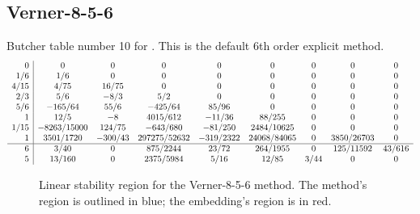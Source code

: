 \documentclass[letterpaper,10pt,english]{sphinxmanual}
\begin{document}
\subsection{Verner-8-5-6}
\label{Butcher:butcher-verner-6-5}\label{Butcher:verner-8-5-6}
Butcher table number 10
for {\hyperref[c_interface/User_callable:ARKodeSetERKTableNum]{}}.  This is
the default 6th order explicit method.
\begin{gather}
\begin{split}\begin{array}{r|cccccccc}
  0 & 0 & 0 & 0 & 0 & 0 & 0 & 0 & 0 \\
  1/6 & 1/6 & 0 & 0 & 0 & 0 & 0 & 0 & 0 \\
  4/15 & 4/75 & 16/75 & 0 & 0 & 0 & 0 & 0 & 0 \\
  2/3 & 5/6 & -8/3 & 5/2 & 0 & 0 & 0 & 0 & 0 \\
  5/6 & -165/64 & 55/6 & -425/64 & 85/96 & 0 & 0 & 0 & 0 \\
  1 & 12/5 & -8 & 4015/612 & -11/36 & 88/255 & 0 & 0 & 0 \\
  1/15 & -8263/15000 & 124/75 & -643/680 & -81/250 & 2484/10625 & 0 & 0 & 0 \\
  1 & 3501/1720 & -300/43 & 297275/52632 & -319/2322 & 24068/84065 & 0 & 3850/26703 & 0 \\
  \hline
  6 & 3/40 & 0 & 875/2244 & 23/72 & 264/1955 & 0 & 125/11592 & 43/616 \\
  5 & 13/160 & 0 & 2375/5984 & 5/16 & 12/85 & 3/44 & 0 & 0
\end{array}\end{split}\notag
\end{gather}\begin{figure}[htbp]
\centering
\capstart

\caption{Linear stability region for the Verner-8-5-6 method.  The method's
region is outlined in blue; the embedding's region is in red.}\end{figure}
\end{document}
